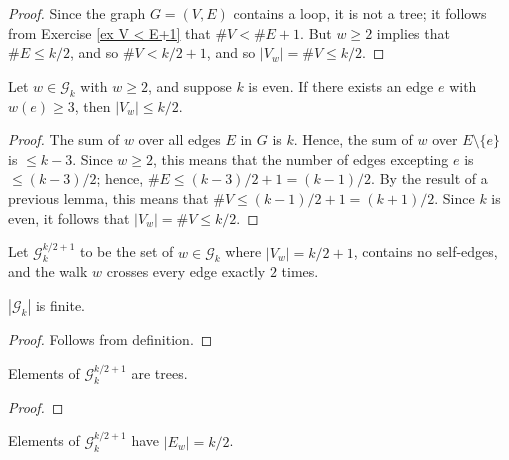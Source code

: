 \begin{proof}
  Since the graph $G = (V,E)$ contains a loop, it is not a tree; it follows from
  Exercise \ref{ex V < E+1} that $\#V < \#E+1$.  But $w\ge 2$ implies that $\#E\le k/2$, and so
  $\#V < k/2+1$, and so $|V_w| = \#V \le k/2$.
\end{proof}


\begin{proposition}%
  \label{prop:g_bound_large_w}
  Let $w \in\mathcal{G}_k$ with $w\ge 2$, and suppose $k$ is even. If there exists an edge $e$
  with $w(e)\ge 3$, then $|V_w|\le k/2$.
\end{proposition}

\begin{proof}
  The sum of $w$ over all edges $E$ in $G$ is $k$.  Hence, the sum of $w$ over $E\setminus\{e\}$ is $\le k-3$.  Since $w\ge 2$, this means that the number of edges excepting $e$ is $\le (k-3)/2$; hence, $\#E \le (k-3)/2+1 = (k-1)/2$.  By the result of a previous lemma, this means that $\#V \le (k-1)/2+1 = (k+1)/2$.  Since $k$ is even, it follows that $|V_w|=\#V \le k/2$.
\end{proof}


\begin{definition}
  \label{def:special_set_g}
  Let $\mathcal{G}^{k/2+1}_k$ to be the set of $w\in\mathcal{G}_k$ where $|V_w|=k/2+1$,
  contains no self-edges, and the walk $w$ crosses every edge exactly $2$ times.
\end{definition}


\begin{lemma}
  \label{lem:graph_set_finite}
  $|\mathcal{G}_k|$ is finite.
\end{lemma}

\begin{proof}
  Follows from definition.
\end{proof}


\begin{lemma}
  \label{lem:special_g_tree}
  Elements of $\mathcal{G}_k^{k/2+1}$ are trees.
\end{lemma}

\begin{proof}
\end{proof}


\begin{lemma}
  \label{lem:special_g_edge_count}
  Elements of $\mathcal{G}_k^{k/2+1}$ have $|E_w| = k/2$.
\end{lemma}

